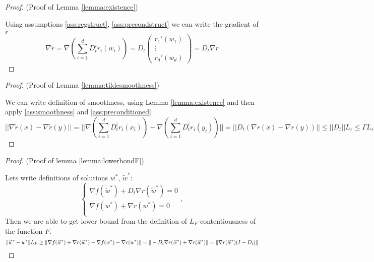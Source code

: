 \begin{proof} (Proof of Lemma \ref{lemma:existence})

Using assumptions \ref{ass:regstruct}, \ref{ass:precondstruct} we can write the gradient of $\widetilde{r}$
    \begin{equation*}
        \nabla \widetilde{r} = \nabla \left( \sum_{i=1}^d D_t^i r_i(w_i) \right) = D_t \begin{pmatrix}
  r_1'(w_1) \\
  \vdots  \\
  r_d'(w_d)
 \end{pmatrix} = D_t \nabla r
    \end{equation*}
\end{proof}

\begin{proof} (Proof of Lemma \ref{lemma:tildesmoothness})

We can write definition of smoothness, using Lemma \ref{lemma:existence} and then apply \ref{ass:smoothness} and \ref{ass:preconditioned}
\begin{equation*}
    || \nabla \widetilde{r}(x) - \nabla \widetilde{r}(y) || =
    || \nabla \left( \sum_{i=1}^d D_t^i r_i(x_i) \right) - \nabla \left( \sum_{i=1}^d D_t^i r_i(y_i) \right) || =
    ||D_t \left( \nabla r(x) - \nabla r(y) \right)|| \le  ||D_t|| L_r \le \Gamma L_r
\end{equation*}
\end{proof}

\begin{proof} (Proof of lemma \ref{lemma:lowerbondF})

    Lets write definitions of solutions $w^*$, $\widetilde{w}^*$:
        \begin{equation*}
        \begin{cases}
            \nabla f (\widetilde{w}^*) + D_t \nabla r(\widetilde{w}^*) = 0\\
            \nabla f (w^*) + \nabla r(w^*) = 0\\
        \end{cases},
        \end{equation*}
        Then we are able to get lower bound from the definition of $L_F$-contentiousness of the function $F$.
        \begin{equation*}
        \|\widetilde{w}^* - w^* \| L_F \geq \| \nabla f (\widetilde{w}^*) + \nabla r(\widetilde{w}^*) - \nabla f (w^*) - \nabla r (w^*) \| \\
        = \| - D_t \nabla r (\widetilde{w}^*) + \nabla r(\widetilde{w}^*) \|  = \| \nabla r (\widetilde{w}^*) (I - D_t)\|
        \end{equation*}
\end{proof}

